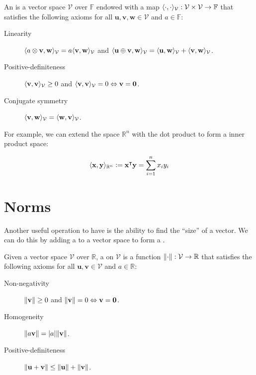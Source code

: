 \begin{definition}
An  is a vector space $\mathcal{V}$ over $\mathbb{F}$ endowed with a map $\langle\cdot, \cdot\rangle_\mathcal{V} : \mathcal{V} \times \mathcal{V} \to \mathbb{F}$ that satisfies the following axioms for all $\mathbf{u}, \mathbf{v}, \mathbf{w} \in \mathcal{V}$ and $a \in \mathbb{F}$:
\begin{description}
  \item[Linearity] $\langle a \otimes \mathbf{v}, \mathbf{w}\rangle_\mathcal{V} = a \langle\mathbf{v}, \mathbf{w}\rangle_\mathcal{V}$ and $\langle\mathbf{u} \oplus \mathbf{v}, \mathbf{w}\rangle_\mathcal{V} = \langle\mathbf{u}, \mathbf{w}\rangle_\mathcal{V} + \langle\mathbf{v}, \mathbf{w}\rangle_\mathcal{V}$.
  \item[Positive-definiteness] $\langle\mathbf{v}, \mathbf{v}\rangle_\mathcal{V} \geq 0$ and $\langle\mathbf{v}, \mathbf{v}\rangle_\mathcal{V} = 0 \Leftrightarrow \mathbf{v} = \mathbf{0}$.
  \item[Conjugate symmetry] $\langle\mathbf{v}, \mathbf{w}\rangle_\mathcal{V} = \langle\mathbf{w}, \mathbf{v}\rangle_\mathcal{V}$.
\end{description}
\end{definition}

For example, we can extend the space $\mathbb{R}^n$ with the dot product to form a inner product space:

\begin{equation}
  \langle\mathbf{x}, \mathbf{y}\rangle_{\mathbb{R}^n} \vcentcolon= \mathbf{x}^\intercal \mathbf{y} = \sum_{i=1}^n x_i y_i
\end{equation}


\section{Norms}
Another useful operation to have is the ability to find the ``size'' of a vector. We can do this by adding a  to a vector space to form a .
\begin{definition}[Norm]
Given a vector space $\mathcal{V}$ over $\mathbb{R}$, a  on $\mathcal{V}$ is a function $\lVert\cdot\rVert : \mathcal{V} \to \mathbb{R}$ that satisfies the following axioms for all $\mathbf{u}, \mathbf{v} \in \mathcal{V}$ and $a \in \mathbb{R}$:
\begin{description}
  \item[Non-negativity] $\lVert\mathbf{v}\rVert \geq 0$ and $\lVert\mathbf{v}\rVert = 0 \Leftrightarrow \mathbf{v} = \mathbf{0}$.
  \item[Homogeneity] $\lVert a \mathbf{v}\rVert = \lvert a\rvert \lVert\mathbf{v}\rVert$.
  \item[Positive-definiteness] $\lVert\mathbf{u} + \mathbf{v}\rVert \leq \lVert\mathbf{u}\rVert + \lVert\mathbf{v}\rVert$.
\end{description}
\end{definition}

